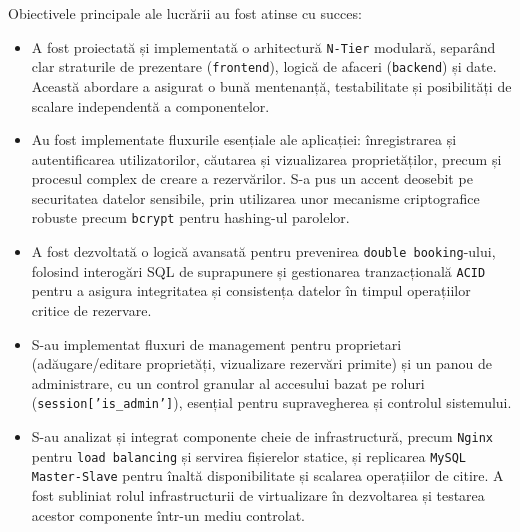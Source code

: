 \documentclass[12pt, a4paper, oneside, romanian]{teza-upb}
\begin{document}
Obiectivele principale ale lucrării au fost atinse cu succes:
\begin{itemize}
	\item A fost proiectată și implementată o arhitectură \texttt{N-Tier} modulară, separând clar straturile de prezentare (\texttt{frontend}), logică de afaceri (\texttt{backend}) și date. Această abordare a asigurat o bună mentenanță, testabilitate și posibilități de scalare independentă a componentelor.
	\item Au fost implementate fluxurile esențiale ale aplicației: înregistrarea și autentificarea utilizatorilor, căutarea și vizualizarea proprietăților, precum și procesul complex de creare a rezervărilor. S-a pus un accent deosebit pe securitatea datelor sensibile, prin utilizarea unor mecanisme criptografice robuste precum \texttt{bcrypt} pentru hashing-ul parolelor.
	\item A fost dezvoltată o logică avansată pentru prevenirea \texttt{double booking}-ului, folosind interogări SQL de suprapunere și gestionarea tranzacțională \texttt{ACID} pentru a asigura integritatea și consistența datelor în timpul operațiilor critice de rezervare.
	\item S-au implementat fluxuri de management pentru proprietari (adăugare/editare proprietăți, vizualizare rezervări primite) și un panou de administrare, cu un control granular al accesului bazat pe roluri (\texttt{session['is\_admin']}), esențial pentru supravegherea și controlul sistemului.
	\item S-au analizat și integrat componente cheie de infrastructură, precum \texttt{Nginx} pentru \texttt{load balancing} și servirea fișierelor statice, și replicarea \texttt{MySQL Master-Slave} pentru înaltă disponibilitate și scalarea operațiilor de citire. A fost subliniat rolul infrastructurii de virtualizare în dezvoltarea și testarea acestor componente într-un mediu controlat.
\end{itemize}
\end{document}
